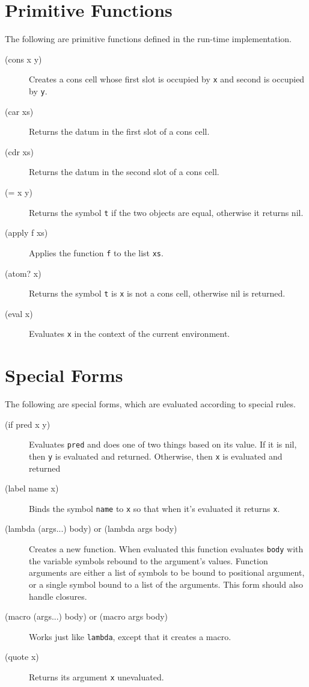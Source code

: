 \documentclass[12pt]{article}
\begin{document}
\section{Primitive Functions}

The following are primitive functions defined in the run-time implementation.

\begin{description}
\item[(cons x y)] Creates a cons cell whose first slot is occupied by \verb!x!
  and second is occupied by \verb!y!.

\item[(car xs)] Returns the datum in the first slot of a cons cell.

\item[(cdr xs)] Returns the datum in the second slot of a cons cell.

\item[(= x y)] Returns the symbol \verb!t! if the two objects are equal,
  otherwise it returns nil.

\item[(apply f xs)] Applies the function \verb!f! to the list \verb!xs!.

\item[(atom? x)] Returns the symbol \verb!t! is \verb!x! is not a cons cell,
  otherwise nil is returned.

\item[(eval x)] Evaluates \verb!x! in the context of the current environment.
\end{description}

\section{Special Forms}

The following are special forms, which are evaluated according to special rules.

\begin{description}
\item[(if pred x y)] Evaluates \verb!pred! and does one of two things based on
  its value. If it is nil, then \verb!y! is evaluated and returned. Otherwise,
  then \verb!x! is evaluated and returned

\item[(label name x)] Binds the symbol \verb!name! to \verb!x! so that when it's
  evaluated it returns \verb!x!.

\item[(lambda (args...) body) or (lambda args body)] Creates a new
  function. When evaluated this function evaluates \verb!body! with the
  variable symbols rebound to the argument's values.  Function arguments are
  either a list of symbols to be bound to positional argument, or a single
  symbol bound to a list of the arguments. This form should also handle
  closures.

\item[(macro (args...) body) or (macro args body)] Works just like
  \verb!lambda!, except that it creates a macro.

\item[(quote x)] Returns its argument \verb!x! unevaluated.
\end{description}
\end{document}
